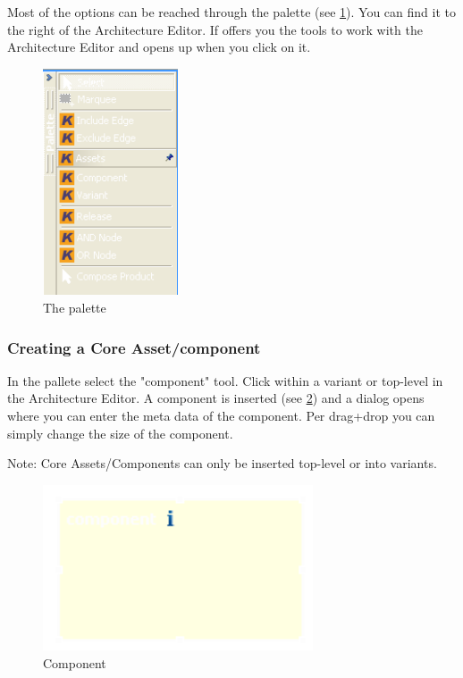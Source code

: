 Most of the options can be reached through the palette (see \ref{palette}).
You can find it to the right of the Architecture Editor. If offers you the tools
to work with the Architecture Editor and opens up when you click on it.

\begin{figure}[h!]
\begin{center}
\includegraphics[width=4cm]{palette.png}
   \caption{The palette}
\label{palette}
\end{center}
\end{figure}\par


\subsubsection{Creating a Core Asset/component}

In the pallete select the "component" tool. Click within a variant or top-level in 
the Architecture Editor. A component is inserted (see \ref{component}) and a dialog opens where you can enter the meta data of
the component. Per drag+drop you can simply change the size of the component. \par
Note: Core Assets/Components can only be inserted top-level or into variants.

\begin{figure}[h!]
\begin{center}
\includegraphics[width=8cm]{component.png}
   \caption{Component}
\label{component}
\end{center}
\end{figure}\par

